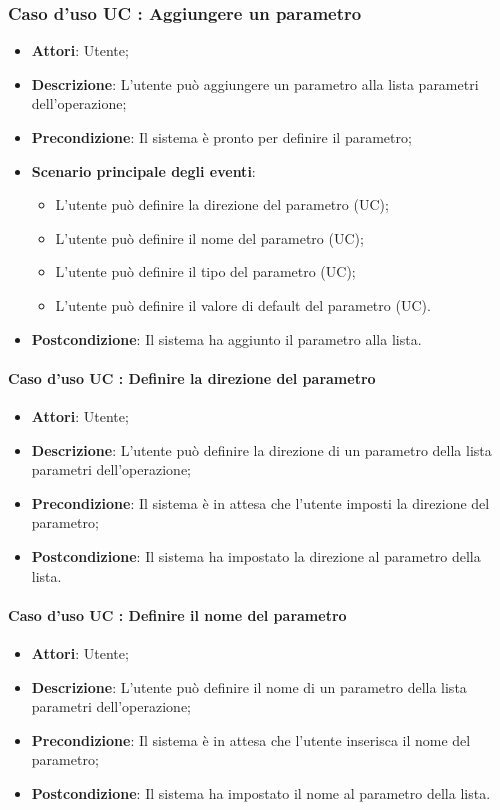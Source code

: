 \documentclass[../AnalisiDeiRequisiti.tex]{subfiles}
\begin{document}
		\subsubsection{Caso d'uso UC : Aggiungere un parametro}
			\begin{itemize}
				\item \textbf{Attori}: Utente;
				\item \textbf{Descrizione}: L'utente può aggiungere un parametro alla lista
				parametri dell'operazione;
				\item \textbf{Precondizione}: Il sistema è pronto per definire il parametro;
				\item \textbf{Scenario principale degli eventi}:
					\begin{itemize}
						\item L'utente può definire la direzione del parametro (UC);
						\item L'utente può definire il nome del parametro (UC);
						\item L'utente può definire il tipo del parametro (UC);
						\item L'utente può definire il valore di default del parametro (UC).
					\end{itemize}
				\item \textbf{Postcondizione}: Il sistema ha aggiunto il parametro alla lista.
			\end{itemize}
		\paragraph{Caso d'uso UC : Definire la direzione del parametro}
			\begin{itemize}
				\item \textbf{Attori}: Utente;
				\item \textbf{Descrizione}: L'utente può definire la direzione di un parametro
				della lista parametri dell'operazione;
				\item \textbf{Precondizione}: Il sistema è in attesa che l'utente imposti
				la direzione del parametro;
				\item \textbf{Postcondizione}: Il sistema ha impostato la direzione al
				parametro della lista.
			\end{itemize}
		\paragraph{Caso d'uso UC : Definire il nome del parametro}
			\begin{itemize}
				\item \textbf{Attori}: Utente;
				\item \textbf{Descrizione}: L'utente può definire il nome di un parametro
				della lista parametri dell'operazione;
				\item \textbf{Precondizione}: Il sistema è in attesa che l'utente inserisca
				il nome del parametro;
				\item \textbf{Postcondizione}: Il sistema ha impostato il nome al parametro
				della lista.
			\end{itemize}
\end{document}

